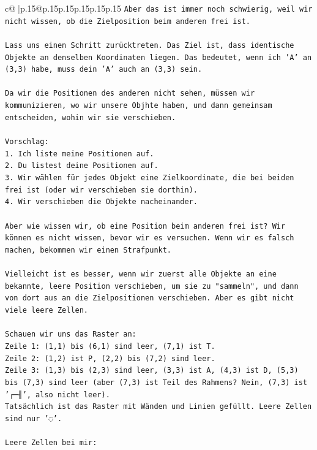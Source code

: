 \documentclass{article}
\begin{document}
{\begin{supertabular}{c@{$\;$}|p{.15\linewidth}@{}p{.15\linewidth}p{.15\linewidth}p{.15\linewidth}p{.15\linewidth}p{.15\linewidth}}
{{{\texttt{Aber das ist immer noch schwierig, weil wir nicht wissen, ob die Zielposition beim anderen frei ist.} \\
\\ 
\texttt{Lass uns einen Schritt zurücktreten. Das Ziel ist, dass identische Objekte an denselben Koordinaten liegen. Das bedeutet, wenn ich 'A' an (3,3) habe, muss dein 'A' auch an (3,3) sein.} \\
\\ 
\texttt{Da wir die Positionen des anderen nicht sehen, müssen wir kommunizieren, wo wir unsere Objhte haben, und dann gemeinsam entscheiden, wohin wir sie verschieben.} \\
\\ 
\texttt{Vorschlag:} \\
\texttt{1. Ich liste meine Positionen auf.} \\
\texttt{2. Du listest deine Positionen auf.} \\
\texttt{3. Wir wählen für jedes Objekt eine Zielkoordinate, die bei beiden frei ist (oder wir verschieben sie dorthin).} \\
\texttt{4. Wir verschieben die Objekte nacheinander.} \\
\\ 
\texttt{Aber wie wissen wir, ob eine Position beim anderen frei ist? Wir können es nicht wissen, bevor wir es versuchen. Wenn wir es falsch machen, bekommen wir einen Strafpunkt.} \\
\\ 
\texttt{Vielleicht ist es besser, wenn wir zuerst alle Objekte an eine bekannte, leere Position verschieben, um sie zu "sammeln", und dann von dort aus an die Zielpositionen verschieben. Aber es gibt nicht viele leere Zellen.} \\
\\ 
\texttt{Schauen wir uns das Raster an:} \\
\texttt{Zeile 1: (1,1) bis (6,1) sind leer, (7,1) ist T.} \\
\texttt{Zeile 2: (1,2) ist P, (2,2) bis (7,2) sind leer.} \\
\texttt{Zeile 3: (1,3) bis (2,3) sind leer, (3,3) ist A, (4,3) ist D, (5,3) bis (7,3) sind leer (aber (7,3) ist Teil des Rahmens? Nein, (7,3) ist '┌─╢', also nicht leer).} \\
\texttt{Tatsächlich ist das Raster mit Wänden und Linien gefüllt. Leere Zellen sind nur '◌'.} \\
\\ 
\texttt{Leere Zellen bei mir:} \\
}}}
\end{supertabular}}
\end{document}
